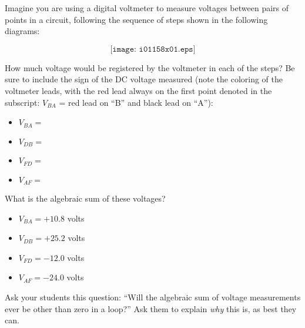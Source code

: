 

Imagine you are using a digital voltmeter to measure voltages between pairs of points in a circuit, following the sequence of steps shown in the following diagrams:

$$\texttt{[image: i01158x01.eps]}$$

How much voltage would be registered by the voltmeter in each of the steps?  Be sure to include the sign of the DC voltage measured (note the coloring of the voltmeter leads, with the red lead always on the first point denoted in the subscript: $V_{BA}$ = red lead on ``B'' and black lead on ``A''):

\begin{itemize}
\item{} $V_{BA} = $
\item{} $V_{DB} = $
\item{} $V_{FD} = $
\item{} $V_{AF} = $
\end{itemize}

What is the algebraic sum of these voltages?







\begin{itemize}
\item{} $V_{BA} = +10.8$ volts
\item{} $V_{DB} = +25.2$ volts
\item{} $V_{FD} = -12.0$ volts
\item{} $V_{AF} = -24.0$ volts
\end{itemize}







Ask your students this question: ``Will the algebraic sum of voltage measurements ever be other than zero in a loop?''  Ask them to explain {\it why} this is, as best they can.




